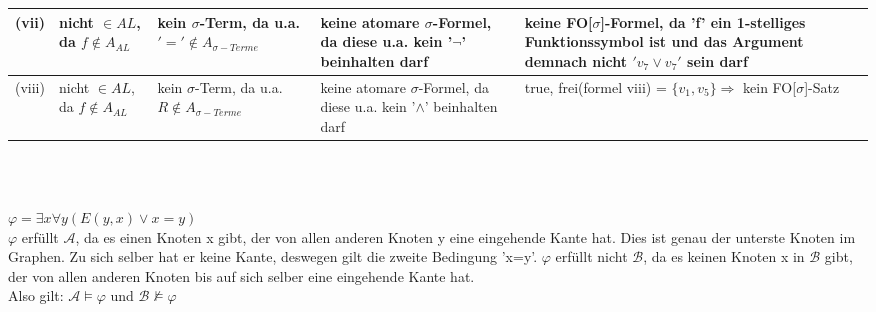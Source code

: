 \documentclass[a4paper,10pt]{article}
\begin{document}
\begin{compactenum} [(a)]
\begin{tabular}  {c|L{3cm}|L{3cm}|L{4cm}|L{4cm}}
			(vii) & nicht $ \in AL $, da $ f \not\in A_{AL} $& kein $ \sigma $-Term, da u.a. $ '= ' \not\in A_{\sigma -Terme}$ &keine atomare $ \sigma $-Formel, da diese u.a. kein '$ \lnot $' beinhalten darf& keine FO[$ \sigma $]-Formel, da 'f' ein 1-stelliges Funktionssymbol ist und das Argument demnach nicht $ 'v_7 \vee v_7' $ sein darf\\ \hline
			
			(viii) & nicht $ \in AL $, da $ f \not\in A_{AL} $& kein $ \sigma $-Term, da u.a. $ R \not\in A_{\sigma -Terme}$ &keine atomare $ \sigma $-Formel, da diese u.a. kein '$ \wedge $' beinhalten darf& true, frei(formel viii) = $ \{v_1,v_5\} \Longrightarrow$ kein FO[$ \sigma $]-Satz \\ \hline
		\end{tabular} \\\\
		
		
		\item $ \varphi = \exists x \forall y (E(y,x)\vee x=y)$\\
		$ \varphi $ erfüllt $ \mathcal{A} $, da es einen Knoten x gibt, der von allen anderen Knoten y eine eingehende Kante hat. Dies ist genau der unterste Knoten im Graphen. Zu sich selber hat er keine Kante, deswegen gilt die zweite Bedingung 'x=y'. $ \varphi $ erfüllt nicht $ \mathcal{B} $, da es keinen Knoten x in $ \mathcal{B} $ gibt, der von allen anderen Knoten bis auf sich selber eine eingehende Kante hat.\\
		Also gilt: $ \mathcal{A} \models \varphi $ und $ \mathcal{B} \not\models \varphi$
		
	\end{compactenum}
	
	
\end{document}
